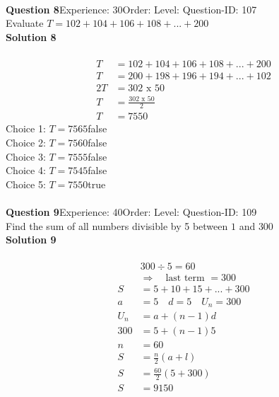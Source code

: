 \documentclass{article}
\begin{document}
\\[4pt]
\noindent\textbf{Question 8}\hspace{20pt}Experience: 30\hspace{20pt}Order: \hspace{20pt}Level: \hspace{20pt}Question-ID: 107\\[2pt]
Evaluate $T=102+104+106+108+...+200$\\[4pt]
\noindent\textbf{Solution 8}\\[2pt]
\\[-35pt]\begin{align*}
T&=102+104+106+108+...+200\\[2pt]
T&=200+198+196+194+...+102\\[2pt]
2T&=302\,\,\text{x}\,\,50\\[2pt]
T&=\displaystyle\frac{302\,\,\text{x}\,\,50}{2}\\[2pt]
T&=7550
\end{align*}
Choice 1: \hspace{20pt}$T=7565$\hspace{20pt}false\\
Choice 2: \hspace{20pt}$T=7560$\hspace{20pt}false\\
Choice 3: \hspace{20pt}$T=7555$\hspace{20pt}false\\
Choice 4: \hspace{20pt}$T=7545$\hspace{20pt}false\\
Choice 5: \hspace{20pt}$T=7550$\hspace{20pt}true\\
\\[4pt]
\noindent\textbf{Question 9}\hspace{20pt}Experience: 40\hspace{20pt}Order: \hspace{20pt}Level: \hspace{20pt}Question-ID: 109\\[2pt]
Find the sum of all numbers divisible by 5 between $1$ and $300$\\[4pt]
\noindent\textbf{Solution 9}\\[2pt]
\\[-35pt]\begin{align*}
&300 \div 5 = 60\\[2pt]
&\Rightarrow \quad \text{last term }= 300\\[2pt]
S&=5+10+15+...+300\\[12pt]
a&=5\quad d=5 \quad U_n=300\\[2pt]
U_n&=a+(n-1)d\\[2pt]
300&=5+(n-1)5\\[2pt]
n&=60\\[12pt]
S&=\displaystyle\frac{n}{2}(a+l)\\[2pt]
S&=\displaystyle\frac{60}{2}(5+300)\\[2pt]
S&=9150\\[-50pt]
\end{align*}
\end{document}
